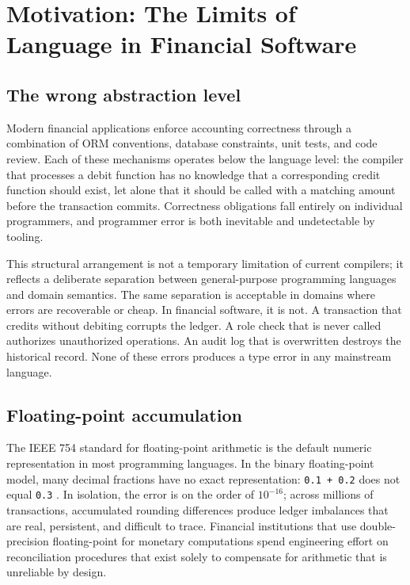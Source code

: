 \documentclass[11pt,a4paper]{article}
\theoremstyle{remark}
\begin{document}
\section{Motivation: The Limits of Language in Financial Software}\label{sec:motivation}

\subsection{The wrong abstraction level}

Modern financial applications enforce accounting correctness through a
combination of ORM conventions, database constraints, unit tests, and
code review. Each of these mechanisms operates below the language level:
the compiler that processes a debit function has no knowledge that a
corresponding credit function should exist, let alone that it should be
called with a matching amount before the transaction commits.
Correctness obligations fall entirely on individual programmers, and
programmer error is both inevitable and undetectable by tooling.

This structural arrangement is not a temporary limitation of current
compilers; it reflects a deliberate separation between general-purpose
programming languages and domain semantics. The same separation is
acceptable in domains where errors are recoverable or cheap. In
financial software, it is not. A transaction that credits without
debiting corrupts the ledger. A role check that is never called
authorizes unauthorized operations. An audit log that is overwritten
destroys the historical record. None of these errors produces a type
error in any mainstream language.

\subsection{Floating-point accumulation}

The IEEE 754 standard for floating-point arithmetic is the default
numeric representation in most programming languages. In the binary
floating-point model, many decimal fractions have no exact
representation: \texttt{0.1 + 0.2} does not equal \texttt{0.3}
\citep{goldberg_what_1991}. In isolation, the error is on the order of
$10^{-16}$; across millions of transactions, accumulated rounding
differences produce ledger imbalances that are real, persistent, and
difficult to trace. Financial institutions that use double-precision
floating-point for monetary computations spend engineering effort on
reconciliation procedures that exist solely to compensate for arithmetic
that is unreliable by design.
\end{document}
